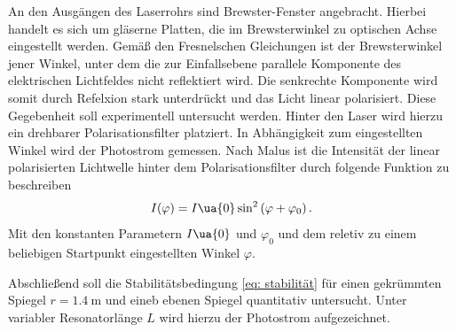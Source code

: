 An den Ausgängen des Laserrohrs sind Brewster-Fenster angebracht. Hierbei handelt es sich um gläserne Platten, die
im Brewsterwinkel zu optischen Achse eingestellt werden. Gemäß den Fresnelschen Gleichungen ist der Brewsterwinkel jener Winkel, unter dem
die zur Einfallsebene parallele Komponente des elektrischen Lichtfeldes nicht reflektiert wird. Die senkrechte Komponente wird somit
durch Refelxion stark unterdrückt und das Licht linear polarisiert. Diese Gegebenheit soll
experimentell untersucht werden. Hinter den Laser wird hierzu ein drehbarer Polarisationsfilter platziert. In Abhängigkeit zum eingestellten Winkel
wird der Photostrom gemessen. Nach Malus ist die Intensität der linear polarisierten Lichtwelle hinter dem Polarisationsfilter
durch folgende Funktion zu beschreiben
\begin{equation}
  I(\varphi) = I\ua{0} \sin^2\left(\varphi + \varphi_0\right).
\end{equation}
Mit den konstanten Parametern $I\ua{0}$ und $\varphi_0$ und dem reletiv zu einem beliebigen Startpunkt eingestellten Winkel $\varphi$.

Abschließend soll die Stabilitätsbedingung \eqref{eq: stabilität} für
einen gekrümmten Spiegel $r = \SI{1.4}{\meter}$ und eineb ebenen Spiegel quantitativ untersucht. Unter variabler Resonatorlänge $L$ wird hierzu der
Photostrom aufgezeichnet.
